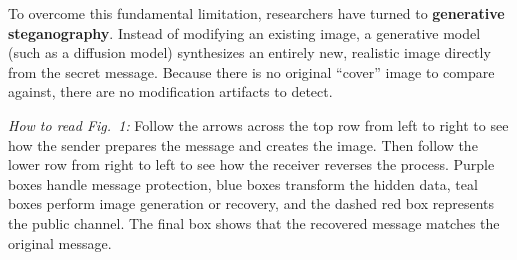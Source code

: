 \documentclass[conference]{IEEEtran}
\begin{document}
To overcome this fundamental limitation, researchers have turned to \textbf{generative steganography}. Instead of modifying an existing image, a generative model (such as a diffusion model) synthesizes an entirely new, realistic image directly from the secret message. Because there is no original ``cover'' image to compare against, there are no modification artifacts to detect.

\textit{How to read Fig.~1:} Follow the arrows across the top row from left to right to see how the sender prepares the message and creates the image. Then follow the lower row from right to left to see how the receiver reverses the process. Purple boxes handle message protection, blue boxes transform the hidden data, teal boxes perform image generation or recovery, and the dashed red box represents the public channel. The final box shows that the recovered message matches the original message.
\end{document}
